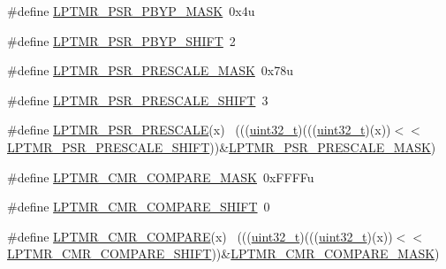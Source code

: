 \begin{DoxyCompactItemize}
\item 
\#define \hyperlink{group___l_p_t_m_r___register___masks_gab3daae6085cf702b31db5be78fe03872}{L\+P\+T\+M\+R\+\_\+\+P\+S\+R\+\_\+\+P\+B\+Y\+P\+\_\+\+M\+A\+SK}~0x4u
\item 
\#define \hyperlink{group___l_p_t_m_r___register___masks_ga4bb5021e396db697f5e597fdcdc222e3}{L\+P\+T\+M\+R\+\_\+\+P\+S\+R\+\_\+\+P\+B\+Y\+P\+\_\+\+S\+H\+I\+FT}~2
\item 
\#define \hyperlink{group___l_p_t_m_r___register___masks_ga93a6fe3fb169a73716a837cedb92dbef}{L\+P\+T\+M\+R\+\_\+\+P\+S\+R\+\_\+\+P\+R\+E\+S\+C\+A\+L\+E\+\_\+\+M\+A\+SK}~0x78u
\item 
\#define \hyperlink{group___l_p_t_m_r___register___masks_ga7ed76902e13634d0c543ade3ef47525a}{L\+P\+T\+M\+R\+\_\+\+P\+S\+R\+\_\+\+P\+R\+E\+S\+C\+A\+L\+E\+\_\+\+S\+H\+I\+FT}~3
\item 
\#define \hyperlink{group___l_p_t_m_r___register___masks_gaeb71c6e1dd5200d74099db29087a59e3}{L\+P\+T\+M\+R\+\_\+\+P\+S\+R\+\_\+\+P\+R\+E\+S\+C\+A\+LE}(x)                                    ~(((\hyperlink{_p_e___types_8h_a33594304e786b158f3fb30289278f5af}{uint32\+\_\+t})(((\hyperlink{_p_e___types_8h_a33594304e786b158f3fb30289278f5af}{uint32\+\_\+t})(x))$<$$<$\hyperlink{group___l_p_t_m_r___register___masks_ga7ed76902e13634d0c543ade3ef47525a}{L\+P\+T\+M\+R\+\_\+\+P\+S\+R\+\_\+\+P\+R\+E\+S\+C\+A\+L\+E\+\_\+\+S\+H\+I\+FT}))\&\hyperlink{group___l_p_t_m_r___register___masks_ga93a6fe3fb169a73716a837cedb92dbef}{L\+P\+T\+M\+R\+\_\+\+P\+S\+R\+\_\+\+P\+R\+E\+S\+C\+A\+L\+E\+\_\+\+M\+A\+SK})
\item 
\#define \hyperlink{group___l_p_t_m_r___register___masks_ga55cc95c022500b353f1724f2cbfe7a8f}{L\+P\+T\+M\+R\+\_\+\+C\+M\+R\+\_\+\+C\+O\+M\+P\+A\+R\+E\+\_\+\+M\+A\+SK}~0x\+F\+F\+F\+Fu
\item 
\#define \hyperlink{group___l_p_t_m_r___register___masks_gae1a525e22dc8b9c6960ae2e859a64232}{L\+P\+T\+M\+R\+\_\+\+C\+M\+R\+\_\+\+C\+O\+M\+P\+A\+R\+E\+\_\+\+S\+H\+I\+FT}~0
\item 
\#define \hyperlink{group___l_p_t_m_r___register___masks_gae5d4cd399ca7bee0964efa18b131a7a9}{L\+P\+T\+M\+R\+\_\+\+C\+M\+R\+\_\+\+C\+O\+M\+P\+A\+RE}(x)                                      ~(((\hyperlink{_p_e___types_8h_a33594304e786b158f3fb30289278f5af}{uint32\+\_\+t})(((\hyperlink{_p_e___types_8h_a33594304e786b158f3fb30289278f5af}{uint32\+\_\+t})(x))$<$$<$\hyperlink{group___l_p_t_m_r___register___masks_gae1a525e22dc8b9c6960ae2e859a64232}{L\+P\+T\+M\+R\+\_\+\+C\+M\+R\+\_\+\+C\+O\+M\+P\+A\+R\+E\+\_\+\+S\+H\+I\+FT}))\&\hyperlink{group___l_p_t_m_r___register___masks_ga55cc95c022500b353f1724f2cbfe7a8f}{L\+P\+T\+M\+R\+\_\+\+C\+M\+R\+\_\+\+C\+O\+M\+P\+A\+R\+E\+\_\+\+M\+A\+SK})

\end{DoxyCompactItemize}
